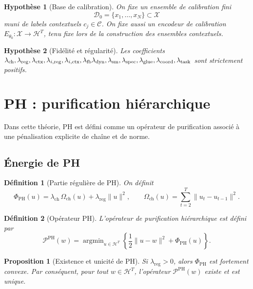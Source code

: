 \documentclass[11pt,a4paper]{article}
\newtheorem{definition}{Définition}[section]
\newtheorem{assumption}{Hypothèse}[section]
\newtheorem{proposition}{Proposition}[section]
\DeclareMathOperator{\argmin}{argmin}
\newcommand{\X}{\mathcal X}
\newcommand{\C}{\mathcal C}
\newcommand{\D}{\mathcal D}
\newcommand{\Hh}{\mathcal H}
\newcommand{\Pcal}{\mathcal P}
\newcommand{\1}{\mathbf 1}
\begin{document}
\begin{assumption}[Base de calibration]
On fixe un ensemble de calibration fini
\[
\D_0=\{x_1,\dots,x_N\}\subset \X
\]
muni de labels contextuels \(c_j\in\C\).  
On fixe aussi un encodeur de calibration \(E_{\theta_0}:\X\to \Hh^T\), tenu fixe lors de la construction des ensembles contextuels.
\end{assumption}

\begin{assumption}[Fidélité et régularité]
Les coefficients \(\lambda_{\mathrm{ch}},\lambda_{\mathrm{reg}},\lambda_{\mathrm{ctx}},\lambda_{i,\mathrm{reg}},\lambda_{i,\mathrm{ctx}},\lambda_{\mathrm{fb}} \\\lambda_{\mathrm{dyn}},\lambda_{\mathrm{sm}},\lambda_{\mathrm{spec}},\lambda_{\mathrm{glue}},\lambda_{\mathrm{coord}},\lambda_{\mathrm{task}}\) sont strictement positifs.
\end{assumption}

\section{PH : purification hiérarchique}

Dans cette théorie, PH est défini comme un opérateur de purification associé à une pénalisation explicite de chaîne et de norme.

\subsection{Énergie de PH}

\begin{definition}[Partie régulière de PH]
On définit
\[
\Phi_{\mathrm{PH}}(u)
=
\lambda_{\mathrm{ch}}\,\Omega_{\mathrm{ch}}(u)
+
\lambda_{\mathrm{reg}}\|u\|^2,
\qquad
\Omega_{\mathrm{ch}}(u)=\sum_{t=2}^T\|u_t-u_{t-1}\|^2.
\]
\end{definition}

\begin{definition}[Opérateur PH]
L'opérateur de purification hiérarchique est défini par
\[
\Pcal^{\mathrm{PH}}(w)
=
\argmin_{u\in\Hh^T}
\left\{
\frac12\|u-w\|^2+\Phi_{\mathrm{PH}}(u)
\right\}.
\]
\end{definition}

\begin{proposition}[Existence et unicité de PH]
Si \(\lambda_{\mathrm{reg}}>0\), alors \(\Phi_{\mathrm{PH}}\) est fortement convexe.  
Par conséquent, pour tout \(w\in\Hh^T\), l'opérateur \(\Pcal^{\mathrm{PH}}(w)\) existe et est unique.
\end{proposition}
\end{document}
